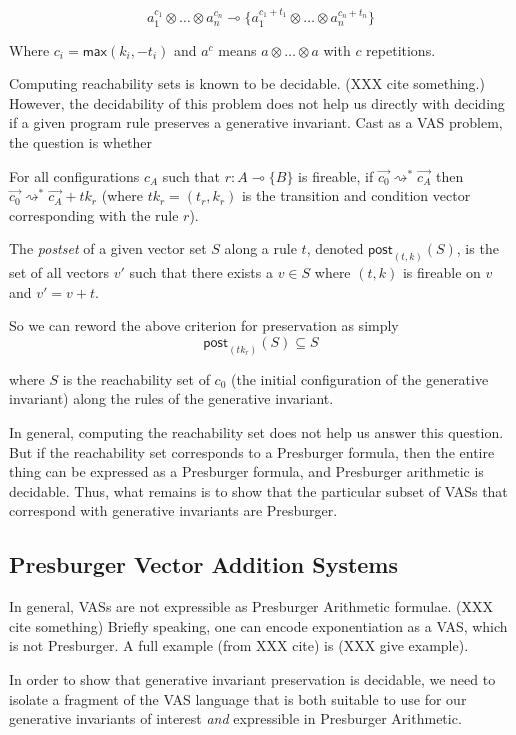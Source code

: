 \documentclass[fullpage, 11pt]{article}
\newcommand{\lolli}{\multimap}
\newcommand{\tensor}{\otimes}
\newcommand{\mon}[1]{\{#1\}}
\newcommand{\stepsto}{\rightsquigarrow}
\begin{document}
\[
a_1^{c_1} \tensor \dots \tensor a_n^{c_n} \lolli
  \mon{a_1^{c_1+t_1}\tensor \dots \tensor a_n^{c_n+t_n} }
\]

Where $c_i = \mathsf{max}(k_i, -t_i)$ and $a^c$ means $a\tensor \dots
\tensor a$ with $c$ repetitions.

Computing reachability sets is known to be decidable. (XXX cite something.) 
However, the decidability of this problem does not help us directly with
deciding if a given program rule preserves a generative invariant. Cast as
a VAS problem, the question is whether

For all configurations $c_{A}$ such that $r : A \lolli \mon{B}$ is
fireable, if $\vec{c_0} \stepsto^* \vec{c_{A}}$ then $\vec{c_0} \stepsto^*
\vec{c_{A}} + tk_r$ (where $tk_r = (t_r, k_r)$ is the transition and
condition vector corresponding with the rule $r$).

The {\em postset} of a given vector set $S$ along a rule $t$, denoted
$\mathsf{post}_{(t,k)}(S)$, is the set of all vectors $v'$ such that there exists
a $v \in S$ where $(t,k)$ is fireable on $v$ and $v' = v + t$.

So we can reword the above criterion for preservation as simply
\[
\mathsf{post}_{(tk_r)}(S) \subseteq S
\]

where $S$ is the reachability set of $c_0$ (the initial configuration of
the generative invariant) along the rules of the generative invariant.

In general, computing the reachability set does not help us answer this
question. But if the reachability set corresponds to a Presburger formula,
then the entire thing can be expressed as a Presburger formula, and
Presburger arithmetic is decidable. Thus, what remains is to show that the
particular subset of VASs that correspond with generative invariants are
Presburger.


\subsection{Presburger Vector Addition Systems}

In general, VASs are not expressible as Presburger Arithmetic formulae.
(XXX cite something) Briefly speaking, one can encode exponentiation as a
VAS, which is not Presburger. A full example (from XXX cite) is (XXX give
example).

In order to show that generative invariant preservation is decidable, we
need to isolate a fragment of the VAS language that is both suitable to use
for our generative invariants of interest {\em and} expressible in
Presburger Arithmetic.
\end{document}

